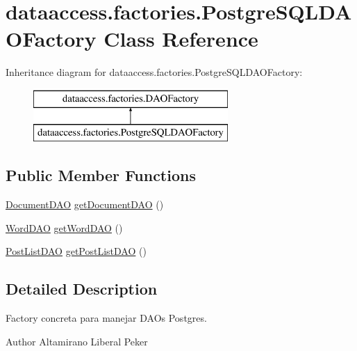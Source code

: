 \hypertarget{classdataaccess_1_1factories_1_1_postgre_s_q_l_d_a_o_factory}{\section{dataaccess.\-factories.\-Postgre\-S\-Q\-L\-D\-A\-O\-Factory \-Class \-Reference}
\label{classdataaccess_1_1factories_1_1_postgre_s_q_l_d_a_o_factory}
}
\-Inheritance diagram for dataaccess.\-factories.\-Postgre\-S\-Q\-L\-D\-A\-O\-Factory\-:\begin{figure}[H]
\begin{center}
\leavevmode
\includegraphics[height=2.000000cm]{classdataaccess_1_1factories_1_1_postgre_s_q_l_d_a_o_factory}
\end{center}
\end{figure}
\subsection*{\-Public \-Member \-Functions}
\begin{DoxyCompactItemize}
\item 
\hyperlink{interfacedataaccess_1_1dao_1_1_document_d_a_o}{\-Document\-D\-A\-O} \hyperlink{classdataaccess_1_1factories_1_1_postgre_s_q_l_d_a_o_factory_abde12332733aac41a711b4e332531c74}{get\-Document\-D\-A\-O} ()
\item 
\hyperlink{interfacedataaccess_1_1dao_1_1_word_d_a_o}{\-Word\-D\-A\-O} \hyperlink{classdataaccess_1_1factories_1_1_postgre_s_q_l_d_a_o_factory_a36c86115a9cd15e15b793e97f982a37d}{get\-Word\-D\-A\-O} ()
\item 
\hyperlink{interfacedataaccess_1_1dao_1_1_post_list_d_a_o}{\-Post\-List\-D\-A\-O} \hyperlink{classdataaccess_1_1factories_1_1_postgre_s_q_l_d_a_o_factory_a97708897273c6ac76c64b4b38816c1e6}{get\-Post\-List\-D\-A\-O} ()
\end{DoxyCompactItemize}


\subsection{\-Detailed \-Description}
\-Factory concreta para manejar \-D\-A\-Os \-Postgres. \begin{DoxyAuthor}{\-Author}
\-Altamirano \-Liberal \-Peker 
\end{DoxyAuthor}


